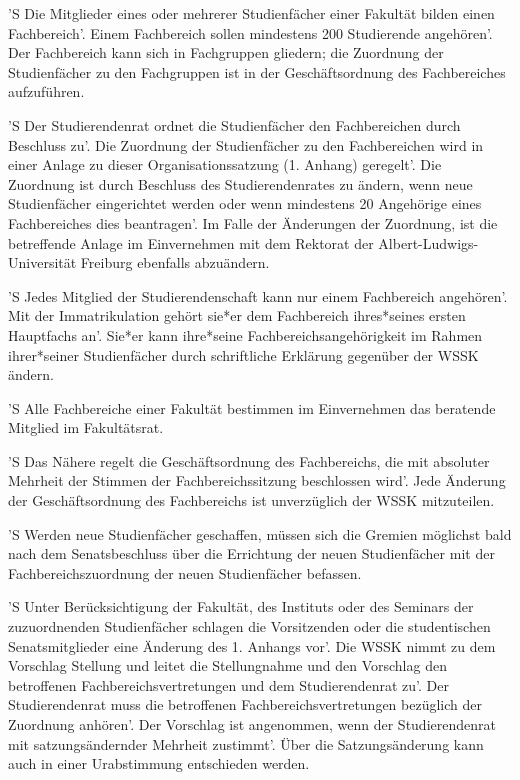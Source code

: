 \documentclass[fontsize=12pt,parskip=half]{scrartcl}
\begin{document}
\begin{contract}


  'S Die Mitglieder eines oder mehrerer Studienfächer einer Fakultät bilden einen
  Fachbereich'. Einem Fachbereich sollen mindestens 200 Studierende angehören'.
  Der Fachbereich kann sich in Fachgruppen gliedern; die Zuordnung der
  Studienfächer zu den Fachgruppen ist in der Geschäftsordnung des Fachbereiches
  aufzuführen.

  'S Der Studierendenrat ordnet die Studienfächer den Fachbereichen durch Beschluss
  zu'. Die Zuordnung der Studienfächer zu den Fachbereichen wird in einer Anlage
  zu dieser Organisationssatzung (1. Anhang) geregelt'. Die Zuordnung ist durch
  Beschluss des Studierendenrates zu ändern, wenn neue Studienfächer
  eingerichtet werden oder wenn mindestens 20 Angehörige eines Fachbereiches
  dies beantragen'. Im Falle der Änderungen der Zuordnung, ist die betreffende
  Anlage im Einvernehmen mit dem Rektorat der Albert-Ludwigs-Universität
  Freiburg ebenfalls abzuändern.

  'S Jedes Mitglied der Studierendenschaft kann nur einem Fachbereich angehören'.
  Mit der Immatrikulation gehört sie*er dem Fachbereich ihres*seines ersten
  Hauptfachs an'. Sie*er kann ihre*seine Fachbereichsangehörigkeit im Rahmen
  ihrer*seiner Studienfächer durch schriftliche Erklärung gegenüber der WSSK
  ändern.

  'S Alle Fachbereiche einer Fakultät bestimmen im Einvernehmen das beratende
  Mitglied im Fakultätsrat.

  'S Das Nähere regelt die Geschäftsordnung des Fachbereichs, die mit absoluter
  Mehrheit der Stimmen der Fachbereichssitzung beschlossen wird'. Jede Änderung
  der Geschäftsordnung des Fachbereichs ist unverzüglich der WSSK mitzuteilen.



  'S Werden neue Studienfächer geschaffen, müssen sich die Gremien möglichst bald
  nach dem Senatsbeschluss über die Errichtung der neuen Studienfächer mit der
  Fachbereichszuordnung der neuen Studienfächer befassen.

  'S Unter Berücksichtigung der Fakultät, des Instituts oder des Seminars der
  zuzuordnenden Studienfächer schlagen die Vorsitzenden oder die studentischen
  Senatsmitglieder eine Änderung des 1. Anhangs vor'. Die WSSK nimmt zu dem
  Vorschlag Stellung und leitet die Stellungnahme und den Vorschlag den
  betroffenen Fachbereichsvertretungen und dem Studierendenrat zu'. Der
  Studierendenrat muss die betroffenen Fachbereichsvertretungen bezüglich der
  Zuordnung anhören'. Der Vorschlag ist angenommen, wenn der Studierendenrat mit
  satzungsändernder Mehrheit zustimmt'. Über die Satzungsänderung kann auch in
  einer Urabstimmung entschieden werden.


\end{contract}
\end{document}
